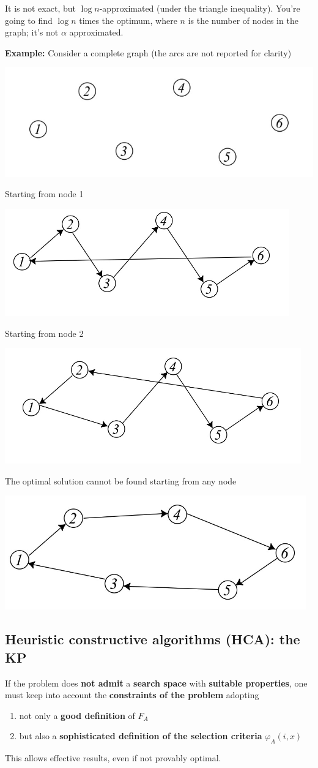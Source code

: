 \documentclass[11pt]{article}
\begin{document}
	It is not exact, but $\log n$-approximated (under the triangle inequality). You're going to find $\log n$ times the optimum, where $n$ is the number of nodes in the graph; it's not $\alpha$ approximated.\\
	
	\newpage
	
	\textbf{Example:} Consider a complete graph (the arcs are not reported for clarity)
	\begin{center}
		\includegraphics[width=0.5\columnwidth]{img/NNTSP1}
	\end{center}
	Starting from node 1 
	\begin{center}
		\includegraphics[width=0.5\columnwidth]{img/NNTSP2}
	\end{center}
	Starting from node 2
	\begin{center}
		\includegraphics[width=0.5\columnwidth]{img/NNTSP3}
	\end{center}
	The optimal solution cannot be found starting from any node
	\begin{center}
		\includegraphics[width=0.5\columnwidth]{img/NNTSP4}
	\end{center}
	
	\newpage
	
	\subsection{Heuristic constructive algorithms (HCA): the KP}
	If the problem does \textbf{not admit} a \textbf{search space} with \textbf{suitable properties}, one must keep into account the \textbf{constraints of the problem} adopting
	\begin{enumerate}
		\item not only a \textbf{good definition} of $F_A$
		\item but also a \textbf{sophisticated definition of the selection criteria} $\varphi_A (i, x)$
	\end{enumerate}
	This allows effective results, even if not provably optimal.\\
	
\end{document}

